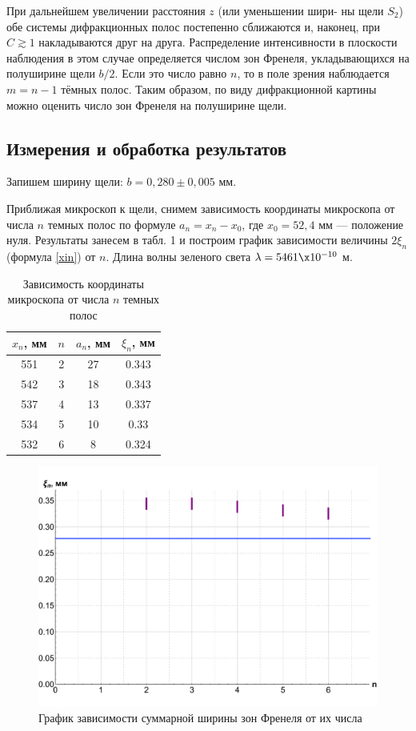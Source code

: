 \documentclass[12pt]{kiarticle}
\begin{document}
При дальнейшем увеличении расстояния $ z $ (или уменьшении шири-
ны щели $ S_2 $) обе системы дифракционных полос постепенно сближаются и, наконец, при $ C \gtrsim 1 $ накладываются друг на друга. Распределение интенсивности в плоскости наблюдения в этом случае определяется
числом зон Френеля, укладывающихся на полуширине щели $ b/2 $. Если это число равно $ n $, то в поле зрения наблюдается $ m = n - 1 $ тёмных полос. Таким образом, по виду дифракционной картины можно оценить
число зон Френеля на полуширине щели.

\subsection{Измерения и обработка результатов}

Запишем ширину щели: $ b = 0,280 \pm 0,005 $ мм. 

Приближая микроскоп к щели, снимем зависимость координаты микроскопа от числа $ n $ темных полос по формуле $ a_n = x_n - x_0 $, где $ x_0 = 52,4 $ мм --- положение нуля. Результаты занесем в табл. 1 и построим график зависимости величины $ 2\xi_n $ (формула \eqref{xin}) от $ n $. Длина волны зеленого света $ \lambda = 5461 \x 10^{-10} $ м. 

\begin{table}[h!]
\caption{Зависимость координаты микроскопа от числа $ n $ темных полос}
\begin{center}
	\begin{tabular}{|c|c|c|c|}
		\hline
		$ x_n $, мм & $ n $ & $ a_n $, мм & $ \xi_n $, мм\\
		\hline
		551 & 2 & 27 & 0.343 \\
		542 & 3 & 18 & 0.343 \\
		537 & 4 & 13 & 0.337 \\
		534 & 5 & 10 & 0.33 \\
		532 & 6 & 8 & 0.324 \\
		\hline
	\end{tabular}
\end{center}
\label{}
\end{table}

	\begin{figure}[h!]
	\label{graf_a}
	\includegraphics[scale=0.47]{gr_a.pdf}
	\caption{График зависимости суммарной ширины зон Френеля от их числа}
\end{figure}
\end{document}
